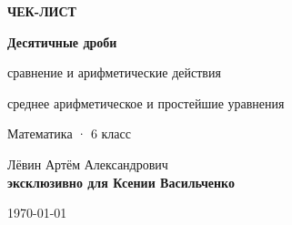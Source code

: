 \documentclass[a4paper,12pt]{article}
\begin{document}

\begin{titlepage}
\thispagestyle{empty}

\begin{center}

\vspace*{2.4cm}

{\Large\bfseries\color{accent} ЧЕК-ЛИСТ}

\vspace{1.1cm}

{\Huge\bfseries
Десятичные дроби
}

\vspace{0.45cm}

{\Large
сравнение и арифметические действия
}

\vspace{0.25cm}

{\Large
среднее арифметическое и простейшие уравнения
}

\vspace{1.7cm}

{\large
Математика · 6 класс
}

\vspace{2.0cm}

{\large
Лёвин Артём Александрович\\[0.4em]
\textbf{эксклюзивно для Ксении Васильченко}
}

\vspace{1.5cm}

{\large \today}

\end{center}

\vfill

\begin{center}
\end{center}

\vspace{0.6cm}

\end{titlepage}

\end{document}
